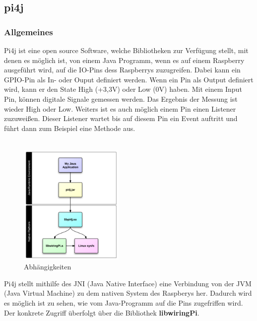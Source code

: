 \subsection{pi4j} \label{subsec:pi4j}
\subsubsection{Allgemeines}
Pi4j ist eine open source Software, welche Bibliotheken zur Verfügung stellt, mit denen es möglich ist, von einem Java Programm, wenn es auf einem Raspberry ausgeführt wird, auf die IO-Pins dess Raspberrys zuzugreifen. Dabei kann ein GPIO-Pin als In- oder Ouput definiert werden. Wenn ein Pin als Output definiert wird, kann er den State High (+3,3V) oder Low (0V) haben. Mit einem Input Pin, können digitale Signale gemessen werden. Das Ergebnis der Messung ist wieder High oder Low. Weiters ist es auch möglich einem Pin einen Listener zuzuweißen. Dieser Listener wartet bis auf diesem Pin ein Event auftritt und führt dann zum Beispiel eine Methode aus. 
\\ \\

\begin{figure}
\vspace{-35pt}
  \begin{center}
    \includegraphics[width=0.45\textwidth]{Bilder/pi4j/dependencies}
  \end{center}
  \caption{Abhängigkeiten}
  \label{Abhaegigkeiten}
  \vspace{-160pt}
\end{figure}

Pi4j stellt mithilfe des JNI (Java Native Interface) eine Verbindung von der JVM (Java Virtual Machine) zu dem nativen System des Raspberys her. Dadurch wird es möglich ist zu sehen, wie vom Java-Programm auf die Pins zugefriffen wird.
\\ Der konkrete Zugriff überfolgt über die Bibliothek \textbf{libwiringPi}.


